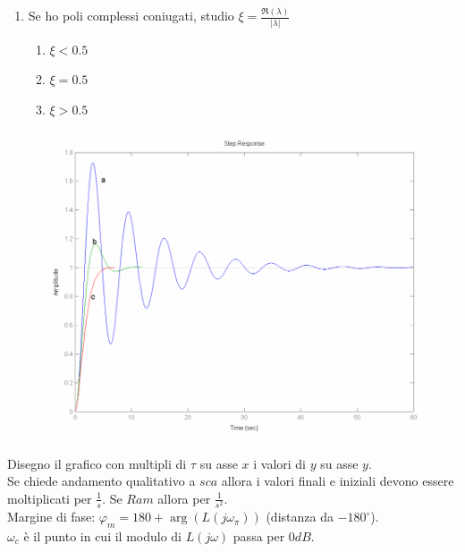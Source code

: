 \documentclass[10pt,landscape, a4paper]{scrartcl} %
\begin{document}
\begin{multicols*}{3}
\begin{enumerate}
	\item Se ho poli complessi coniugati, studio $\xi = \frac{\Re(\lambda)}{|\lambda|}$
	    \begin{multicols*}{2}
			\begin{enumerate}
			\item $\xi < 0.5$
			\item $\xi = 0.5$
			\item $\xi > 0.5$
		\end{enumerate} \includegraphics*[width=1\columnwidth]{xi.png}
		\end{multicols*}
		
\end{enumerate}
Disegno il grafico con multipli di $\tau$ su asse $x$ i valori di $y$ su asse $y$.\\
Se chiede andamento qualitativo a $sca$ allora i valori finali e iniziali devono essere moltiplicati per $\frac{1}{s}$. Se $Ram$ allora per $\frac{1}{s^2}$.\\
Margine di fase: $\varphi_m = 180 + \arg(L(j\omega_\pi))$ (distanza da $-180^{\circ}$).\\
$\omega_c$ è il punto in cui il modulo di $L(j\omega)$ passa per $0 dB$.




\end{multicols*}
\end{document}
